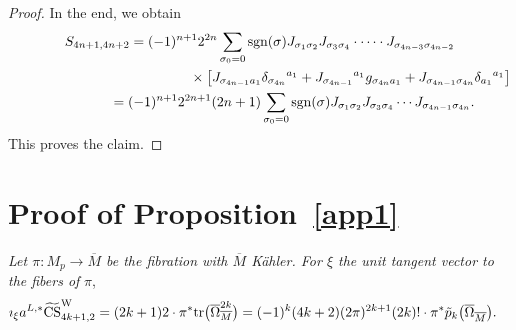 \documentclass[10pt,a4paper]{amsart}
\numberwithin{equation}{section}
\theoremstyle{definition}
\newcommand{\tr}{{\rm tr}}
\newcommand{\bo}{\overline\Omega}
\newcommand{\bom}{\bo_{\overline M}}
\newcommand{\bxi}{\xi}
\newcommand{\ocs}{\widetilde{{\rm CS}}}
\newcommand{\sgn}{{\rm sgn}}
\newcommand{\om}{\overline{M}}
\newcommand{\omp}{M_p}
\begin{document}
\begin{proof}
In the end, we obtain
\begin{gather}
{S_{4n+1,4n+2}} =(-1)^{n+1} 2^{2n}
\sum_{\sigma_0=0} \sgn (\sigma)
J_{\sigma_1 \sigma_2} J_{\sigma_3 \sigma_4} \cdot\dots\cdot
J_{\sigma_{4n-3} \sigma_{4n-2}}
 \nonumber\\
 \hphantom{{S_{4n+1,4n+2}} =(-1)^{n+1} 2^{2n}
\sum_{\sigma_0=0}}{}
\times \bigl[J_{\sigma_{4n-1} a_1} \delta_{\sigma_{4n}}{}^{a_1}
+J_{\sigma_{4n-1}}{}^{a_1}g_{\sigma_{4n} a_{1}}+J_{\sigma_{4n-1} \sigma_{4n}} \delta_{a_1}{}^{a_1} \bigr]\nonumber\\
\hphantom{{S_{4n+1,4n+2}}}{}
=(-1)^{n+1}2^{2n+1}(2n+1)
\sum_{\sigma_0=0} \sgn (\sigma)
J_{\sigma_1 \sigma_2} J_{\sigma_3 \sigma_4} \cdots
J_{\sigma_{4n-1} \sigma_{4n}}.\label{3.5add12}
\end{gather}
This proves the claim.
\end{proof}



\section{Proof of Proposition~\ref{app1}}\label{app:E}


 {\em Let $\pi\colon \omp\to \om$ be the fibration with $\om$ K\"ahler. For $\bxi$ the unit tangent vector to the fibers of }
$\pi$,
\begin{align*}\imath_{\bxi} a^{L,*}\ocs^{\rm W}_{4k+1,2} &=
(2k+1)2\cdot \pi^*\tr\bigl(\bom^{2k}\bigr)
=
(-1)^k (4k+2)(2\pi)^{2k+1}(2k)!
\cdot \pi^*\tilde p_k\bigl(\bom\bigr).
\end{align*}
\end{document}
